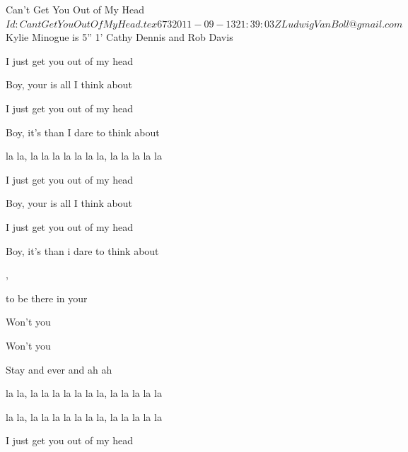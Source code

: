 \begin{SBSong}{Can't Get You Out of My Head}
  {$Id: CantGetYouOutOfMyHead.tex 673 2011-09-13 21:39:03Z LudwigVanBoll@gmail.com $}
  {Kylie Minogue is 5'' 1'}
  {Cathy Dennis and Rob Davis}
  \begin{SBVerse}
    I just  get you out of my head

    Boy, your  is all I think about

    I just  get you out of my head

    Boy, it's  than I dare to think about

     la la, la la la la la  la la, la la la la la
  \end{SBVerse}
  \begin{SBVerse}
    I just  get you out of my head

    Boy, your  is all I think about

    I just  get you out of my head

    Boy, it's  than i dare to think about

     ,  

     to be there in your 

    Won't you  

    Won't you  

    Stay  and ever and  ah ah

     la la, la la la la la  la la, la la la la la

     la la, la la la la la  la la, la la la la la
  \end{SBVerse}
  \CBPageBrk
  \begin{SBVerse}
    I just  get you out of my head


\end{SBVerse}
\end{SBSong}
